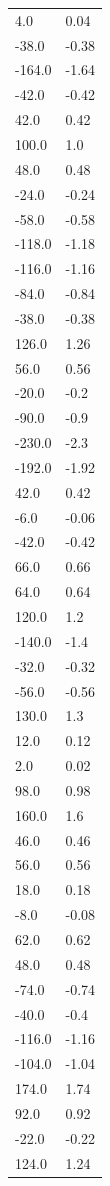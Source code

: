 \begin{longtable}{ll}
4.0 & 0.04 \\
-38.0 & -0.38 \\
-164.0 & -1.64 \\
-42.0 & -0.42 \\
42.0 & 0.42 \\
100.0 & 1.0 \\
48.0 & 0.48 \\
-24.0 & -0.24 \\
-58.0 & -0.58 \\
-118.0 & -1.18 \\
-116.0 & -1.16 \\
-84.0 & -0.84 \\
-38.0 & -0.38 \\
126.0 & 1.26 \\
56.0 & 0.56 \\
-20.0 & -0.2 \\
-90.0 & -0.9 \\
-230.0 & -2.3 \\
-192.0 & -1.92 \\
42.0 & 0.42 \\
-6.0 & -0.06 \\
-42.0 & -0.42 \\
66.0 & 0.66 \\
64.0 & 0.64 \\
120.0 & 1.2 \\
-140.0 & -1.4 \\
-32.0 & -0.32 \\
-56.0 & -0.56 \\
130.0 & 1.3 \\
12.0 & 0.12 \\
2.0 & 0.02 \\
98.0 & 0.98 \\
160.0 & 1.6 \\
46.0 & 0.46 \\
56.0 & 0.56 \\
18.0 & 0.18 \\
-8.0 & -0.08 \\
62.0 & 0.62 \\
48.0 & 0.48 \\
-74.0 & -0.74 \\
-40.0 & -0.4 \\
-116.0 & -1.16 \\
-104.0 & -1.04 \\
174.0 & 1.74 \\
92.0 & 0.92 \\
-22.0 & -0.22 \\
124.0 & 1.24 \\

\end{longtable}
